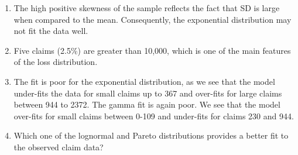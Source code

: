 \documentclass[landscape, 20pt]{extreport}
\theoremstyle{definition}
\theoremstyle{definition}
\theoremstyle{definition}
\theoremstyle{definition}
\theoremstyle{remark}
\begin{document}
\begin{enumerate}
  \begin{enumerate}
  \def\labelenumii{\arabic{enumii}.}
  \item
    The high positive skewness of the sample reflects the fact that
    SD is large when compared to the mean. Consequently, the
    exponential distribution may not fit the data well.
  \item
    Five claims (2.5\%) are greater than 10,000, which is one of the
    main features of the loss distribution.
  \item
    The fit is poor for the exponential distribution, as we see that
    the model under-fits the data for small claims up to 367 and
    over-fits for large claims between 944 to 2372. The gamma fit is
    again poor. We see that the model over-fits for small claims
    between 0-109 and under-fits for claims 230 and 944.
  \item
    Which one of the lognormal and Pareto distributions provides a
    better fit to the observed claim data?
  \end{enumerate}
\end{enumerate}
\end{document}
